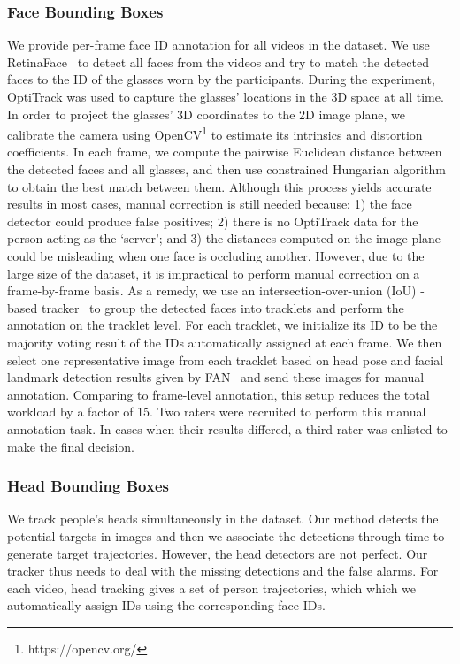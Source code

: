 \documentclass[journal]{IEEEtran}
\begin{document}
\subsubsection{Face Bounding Boxes}
We provide per-frame face ID annotation for all videos in the dataset.
We use RetinaFace~\cite{deng2020retinaface} to detect all faces from the videos and try to match the detected faces to the ID of the glasses worn by the participants.
During the experiment, OptiTrack was used to capture the glasses' locations in the 3D space at all time.
In order to project the glasses' 3D coordinates to the 2D image plane, we calibrate the camera using OpenCV\footnote{https://opencv.org/} to estimate its intrinsics and distortion coefficients.
In each frame, we compute the pairwise Euclidean distance between the detected faces and all glasses, and then use constrained Hungarian algorithm to obtain the best match between them.
Although this process yields accurate results in most cases, manual correction is still needed because: 
1) the face detector could produce false positives; 
2) there is no OptiTrack data for the person acting as the `server'; and 
3) the distances computed on the image plane could be misleading when one face is occluding another.
However, due to the large size of the dataset, it is impractical to perform manual correction on a frame-by-frame basis.
As a remedy, we use an intersection-over-union (IoU) -based tracker~\cite{bochinski2017high} to group the detected faces into tracklets and perform the annotation on the tracklet level.
For each tracklet, we initialize its ID to be the majority voting result of the IDs automatically assigned at each frame.
We then select one representative image from each tracklet based on head pose and facial landmark detection results given by FAN~\cite{bulat2017far} and send these images for manual annotation.
Comparing to frame-level annotation, this setup reduces the total workload by a factor of 15.
Two raters were recruited to perform this manual annotation task.
In cases when their results differed, a third rater was enlisted to make the final decision.




\subsubsection{Head Bounding Boxes}
We track people's heads simultaneously in the dataset.
Our method detects the potential targets in images and then we associate
the detections through time to generate target trajectories.
However, the head detectors are not perfect.
Our tracker thus needs to deal with the missing detections and the false alarms.
For each video, head tracking gives a set of person trajectories, which which we
automatically assign IDs using the corresponding face IDs.  
\end{document}
